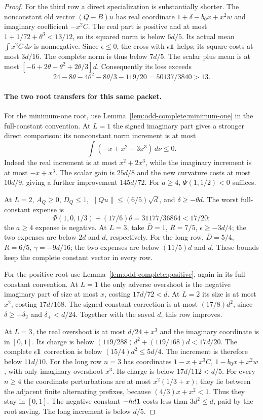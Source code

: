 \begin{proof}
For the third row a direct specialization is substantially shorter.
The nonconstant old vector $(Q-B)u$ has real coordinate
$1+\delta-b_0x+x^2w$ and imaginary coefficient $-x^2C$.
The real part is positive and at most
$1+1/72+\theta^3<13/12$, so its squared norm is below $6d/5$.
Its actual mean $\int x^2C\,d\nu$ is nonnegative.
Since $\epsilon\le0$, the cross with $\epsilon\mathbf1$ helps; its
square costs at most $3d/16$. The complete norm is thus below
$7d/5$. The scalar plus mean is at most
$[-6+2\theta+\theta^2+2\theta/3]d$. Consequently its loss exceeds
\[
 24-8\theta-4\theta^2-8\theta/3-119/20
       =50137/3840>13.
\]

\paragraph{The two root transfers for this same packet.}
For the minimum-one root, use
Lemma~\ref{lem:odd-complete:minimum-one} in the full-constant
convention. At $L=1$ the signed imaginary part gives a stronger
direct comparison: its nonconstant norm increment is at most
\[
 \int(-x+x^2+3x^3)\,d\nu\le0.
\]
Indeed the real increment is at most $x^2+2x^3$, while the imaginary
increment is at most $-x+x^3$. The scalar gain is $25d/8$ and the
new curvature costs at most $10d/9$, giving a further improvement
$145d/72$. For $a\ge4$, $\Psi(1,1/2)<0$ suffices.

At $L=2$, $A_Q\ge0$, $D_Q\le1$, $\|Qu\|\le(6/5)\sqrt d$,
and $\delta\ge-\theta d$. The worst full-constant expense is
\[
 \Phi(1,0,1/3)+(17/6)\theta
       =31177/36864<17/20;
\]
the $a\ge4$ expense is negative.
At $L=3$, take $\bar D=1$, $R=7/5$, $\epsilon\ge-3d/4$;
the two expenses are below $2d$ and $d$, respectively.
For the long row, $\bar D=5/4$, $R=6/5$, $\gamma=-9d/16$;
the two expenses are below $(11/5)d$ and $d$.
These bounds keep the complete constant vector in every row.

For the positive root use
Lemma~\ref{lem:odd-complete:positive}, again in its full-constant
convention. At $L=1$ the only adverse overshoot is the negative
imaginary part of size at most $x$, costing $17d/72<d$.
At $L=2$ its size is at most $x^2$, costing $17d/168$.
The signed constant correction is at most $(17/8)d^2$, since
$\delta\ge-\delta_2$ and $\delta_+<d/24$.
Together with the saved $d$, this row improves.

At $L=3$, the real overshoot is at most $d/24+x^3$ and the
imaginary coordinate is in $[0,1]$. Its charge is below
$(119/288)d^2+(119/168)d<17d/20$.
The complete $\epsilon\mathbf1$ correction is below
$(15/4)d^2\le5d/4$. The increment is therefore below $11d/10$.
For the long row $n=3$ has coordinates
$1-x+x^3C$, $1-b_0x+x^2w$, with only imaginary overshoot $x^3$.
Its charge is below $17d/112<d/5$.
For every $n\ge4$ the coordinate perturbations are at most
$x^2(1/3+x)$; they lie between the adjacent finite alternating
prefixes, because $(4/3)x+x^2<1$. Thus they stay in $[0,1]$.
The negative constant $-hd\mathbf1$ costs less than $3d^2\le d$,
paid by the root saving. The long increment is below $d/5$.


\end{proof}
